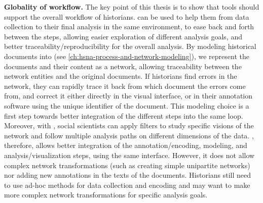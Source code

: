 \noindent\textbf{Globality of \hsna workflow.} The key point of this thesis is to show that \va tools should support the overall \hsna workflow of historians.
\va can be used to help them from data collection to their final analysis in the same environment, to ease back and forth between the steps, allowing easier exploration of different analysis goals, and better traceability/reproducibility for the overall analysis.
By modeling historical documents into \modelplural (see \autoref{ch:hsna-process-and-network-modeling}), we represent the documents and their content as a network, allowing traceability between the network entities and the original documents.
If historians find errors in the network, they can rapidly trace it back from which document the errors come from, and correct it either directly in the visual interface, or in their annotation software using the unique identifier of the document.
This modeling choice is a first step towards better integration of the different steps into the same \va loop.
Moreover, with \combinet, social scientists can apply filters to study specific visions of the network and follow multiple analysis paths on different dimensions of the data.
\name, therefore, allows better integration of the annotation/encoding, modeling, and analysis/visualization steps, using the same interface.
However, it does not allow complex network transformations (such as creating simple unipartite networks) nor adding new annotations in the texts of the documents.
Historians still need to use ad-hoc methods for data collection and encoding and may want to make more complex network transformations for specific analysis goals.







